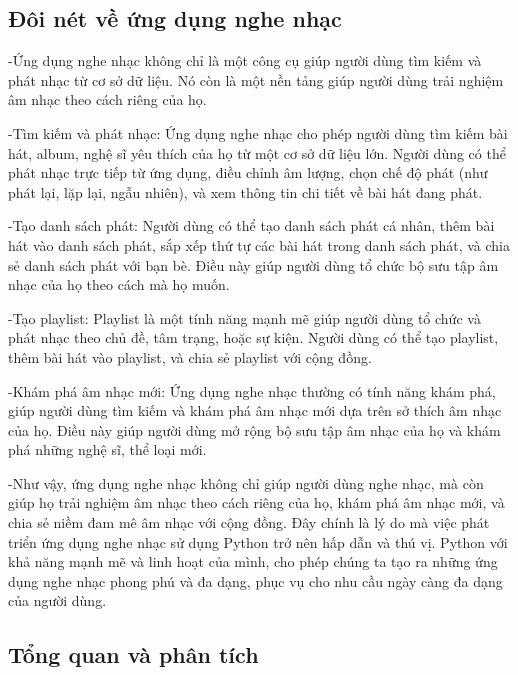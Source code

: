 \documentclass[a4paper]{article}
\begin{document}
\subsection{Đôi nét về ứng dụng nghe nhạc}
\begin{flushleft}
	-Ứng dụng nghe nhạc không chỉ là một công cụ giúp người dùng tìm kiếm và phát nhạc từ cơ sở dữ liệu. Nó còn là một nền tảng giúp người dùng trải nghiệm âm nhạc theo cách riêng của họ.

	-Tìm kiếm và phát nhạc: Ứng dụng nghe nhạc cho phép người dùng tìm kiếm bài hát, album, nghệ sĩ yêu thích của họ từ một cơ sở dữ liệu lớn. Người dùng có thể phát nhạc trực tiếp từ ứng dụng, điều chỉnh âm lượng, chọn chế độ phát (như phát lại, lặp lại, ngẫu nhiên), và xem thông tin chi tiết về bài hát đang phát.

	-Tạo danh sách phát: Người dùng có thể tạo danh sách phát cá nhân, thêm bài hát vào danh sách phát, sắp xếp thứ tự các bài hát trong danh sách phát, và chia sẻ danh sách phát với bạn bè. Điều này giúp người dùng tổ chức bộ sưu tập âm nhạc của họ theo cách mà họ muốn.

	-Tạo playlist: Playlist là một tính năng mạnh mẽ giúp người dùng tổ chức và phát nhạc theo chủ đề, tâm trạng, hoặc sự kiện. Người dùng có thể tạo playlist, thêm bài hát vào playlist, và chia sẻ playlist với cộng đồng.

	-Khám phá âm nhạc mới: Ứng dụng nghe nhạc thường có tính năng khám phá, giúp người dùng tìm kiếm và khám phá âm nhạc mới dựa trên sở thích âm nhạc của họ. Điều này giúp người dùng mở rộng bộ sưu tập âm nhạc của họ và khám phá những nghệ sĩ, thể loại mới.

	-Như vậy, ứng dụng nghe nhạc không chỉ giúp người dùng nghe nhạc, mà còn giúp họ trải nghiệm âm nhạc theo cách riêng của họ, khám phá âm nhạc mới, và chia sẻ niềm đam mê âm nhạc với cộng đồng. Đây chính là lý do mà việc phát triển ứng dụng nghe nhạc sử dụng Python trở nên hấp dẫn và thú vị. Python với khả năng mạnh mẽ và linh hoạt của mình, cho phép chúng ta tạo ra những ứng dụng nghe nhạc phong phú và đa dạng, phục vụ cho nhu cầu ngày càng đa dạng của người dùng.

\end{flushleft}
\subsection{Tổng quan và phân tích}
\end{document}
